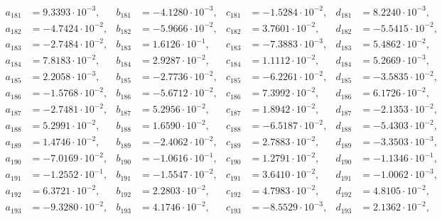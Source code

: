 \begin{align*}
  a_{ 181 } &= 9.3393 \cdot 10^{ -3 }, & b_{ 181 } &= -4.1280 \cdot 10^{ -3 }, & c_{ 181 } &= -1.5284 \cdot 10^{ -2 }, & d_{ 181 } &= 8.2240 \cdot 10^{ -3 }, \\ 
  a_{ 182 } &= -4.7424 \cdot 10^{ -2 }, & b_{ 182 } &= -5.9666 \cdot 10^{ -2 }, & c_{ 182 } &= 3.7601 \cdot 10^{ -2 }, & d_{ 182 } &= -5.5415 \cdot 10^{ -2 }, \\ 
  a_{ 183 } &= -2.7484 \cdot 10^{ -2 }, & b_{ 183 } &= 1.6126 \cdot 10^{ -1 }, & c_{ 183 } &= -7.3883 \cdot 10^{ -3 }, & d_{ 183 } &= 5.4862 \cdot 10^{ -2 }, \\ 
  a_{ 184 } &= 7.8183 \cdot 10^{ -2 }, & b_{ 184 } &= 2.9287 \cdot 10^{ -2 }, & c_{ 184 } &= 1.1112 \cdot 10^{ -2 }, & d_{ 184 } &= 5.2669 \cdot 10^{ -3 }, \\ 
  a_{ 185 } &= 2.2058 \cdot 10^{ -3 }, & b_{ 185 } &= -2.7736 \cdot 10^{ -2 }, & c_{ 185 } &= -6.2261 \cdot 10^{ -2 }, & d_{ 185 } &= -3.5835 \cdot 10^{ -2 }, \\ 
  a_{ 186 } &= -1.5768 \cdot 10^{ -2 }, & b_{ 186 } &= -5.6712 \cdot 10^{ -2 }, & c_{ 186 } &= 7.3992 \cdot 10^{ -2 }, & d_{ 186 } &= 6.1726 \cdot 10^{ -2 }, \\ 
  a_{ 187 } &= -2.7481 \cdot 10^{ -2 }, & b_{ 187 } &= 5.2956 \cdot 10^{ -2 }, & c_{ 187 } &= 1.8942 \cdot 10^{ -2 }, & d_{ 187 } &= -2.1353 \cdot 10^{ -2 }, \\ 
  a_{ 188 } &= 5.2991 \cdot 10^{ -2 }, & b_{ 188 } &= 1.6590 \cdot 10^{ -2 }, & c_{ 188 } &= -6.5187 \cdot 10^{ -2 }, & d_{ 188 } &= -5.4303 \cdot 10^{ -2 }, \\ 
  a_{ 189 } &= 1.4746 \cdot 10^{ -2 }, & b_{ 189 } &= -2.4062 \cdot 10^{ -2 }, & c_{ 189 } &= 2.7883 \cdot 10^{ -2 }, & d_{ 189 } &= -3.3503 \cdot 10^{ -3 }, \\ 
  a_{ 190 } &= -7.0169 \cdot 10^{ -2 }, & b_{ 190 } &= -1.0616 \cdot 10^{ -1 }, & c_{ 190 } &= 1.2791 \cdot 10^{ -2 }, & d_{ 190 } &= -1.1346 \cdot 10^{ -1 }, \\ 
  a_{ 191 } &= -1.2552 \cdot 10^{ -1 }, & b_{ 191 } &= -1.5547 \cdot 10^{ -2 }, & c_{ 191 } &= 3.6410 \cdot 10^{ -2 }, & d_{ 191 } &= -1.0062 \cdot 10^{ -3 }, \\ 
  a_{ 192 } &= 6.3721 \cdot 10^{ -2 }, & b_{ 192 } &= 2.2803 \cdot 10^{ -2 }, & c_{ 192 } &= 4.7983 \cdot 10^{ -2 }, & d_{ 192 } &= 4.8105 \cdot 10^{ -2 }, \\ 
  a_{ 193 } &= -9.3280 \cdot 10^{ -2 }, & b_{ 193 } &= 4.1746 \cdot 10^{ -2 }, & c_{ 193 } &= -8.5529 \cdot 10^{ -3 }, & d_{ 193 } &= 2.1362 \cdot 10^{ -2 }, \\ 

\end{align*}
